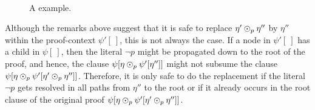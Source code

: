 \begin{figure*}[bt]%
\centering
{}\\%
%

\caption{A {\RPI} example.}
\label{ex:rpi-example}
\end{figure*}


Although the remarks above suggest that it is safe to replace $\eta' \odot_p
\eta''$ by $\eta''$ within the proof-context $\psi'[\ ]$, this is not always the
case. If a node in $\psi'[\ ]$ has a child in $\psi[\ ]$, then the literal $\neg
p$ might be propagated down to the root of the proof, and hence, the clause
$\psi[ \eta \odot_p \psi'[ \eta''] ]$ might not subsume the clause $\psi[ \eta
\odot_p \psi'[\eta' \odot_p \eta''] ]$. Therefore, it is only safe to do the
replacement if the literal $\neg p$ gets resolved in all paths from $\eta''$ to the root or if it already occurs in the root clause of the original proof $\psi[ \eta \odot_p \psi'[\eta' \odot_p \eta''] ]$.

